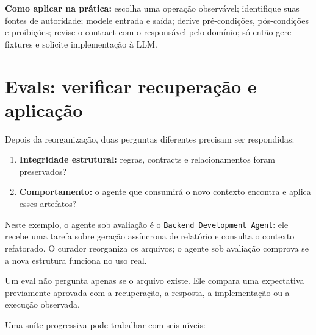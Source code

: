 \documentclass[
  10pt,
  a4paper,
  oneside]{book}
\providecommand{\tightlist}{%
  \setlength{\itemsep}{0pt}\setlength{\parskip}{0pt}}
\begin{document}
\textbf{Como aplicar na prática:} escolha uma operação observável;
identifique suas fontes de autoridade; modele entrada e saída; derive
pré-condições, pós-condições e proibições; revise o contract com o
responsável pelo domínio; só então gere fixtures e solicite
implementação à LLM.

\hypertarget{evals-verificar-recuperauxe7uxe3o-e-aplicauxe7uxe3o}{%
\section{Evals: verificar recuperação e
aplicação}\label{evals-verificar-recuperauxe7uxe3o-e-aplicauxe7uxe3o}}

Depois da reorganização, duas perguntas diferentes precisam ser
respondidas:

\begin{enumerate}
\def\labelenumi{\arabic{enumi}.}
\tightlist
\item
  \textbf{Integridade estrutural:} regras, contracts e relacionamentos
  foram preservados?
\item
  \textbf{Comportamento:} o agente que consumirá o novo contexto
  encontra e aplica esses artefatos?
\end{enumerate}

Neste exemplo, o agente sob avaliação é o
\texttt{Backend\ Development\ Agent}: ele recebe uma tarefa sobre
geração assíncrona de relatório e consulta o contexto refatorado. O
curador reorganiza os arquivos; o agente sob avaliação comprova se a
nova estrutura funciona no uso real.

Um eval não pergunta apenas se o arquivo existe. Ele compara uma
expectativa previamente aprovada com a recuperação, a resposta, a
implementação ou a execução observada.

Uma suíte progressiva pode trabalhar com seis níveis:
\end{document}
